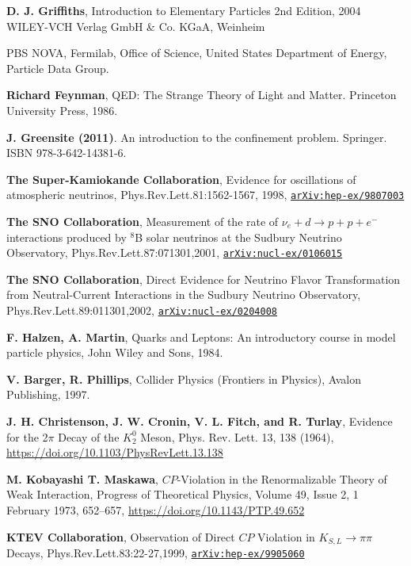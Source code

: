 \documentclass[11pt,a4paper,openright,twoside]{report}
\begin{document}
\begin{thebibliography}{9}
	\textbf{D. J. Griffiths}, Introduction to Elementary Particles 2nd Edition, 2004 WILEY-VCH Verlag GmbH \& Co. KGaA, Weinheim

	PBS NOVA, Fermilab, Office of Science, United States Department of Energy, Particle Data Group.
	
	\textbf{Richard Feynman}, QED: The Strange Theory of Light and Matter. Princeton University Press, 1986.
	
\textbf{J. Greensite (2011)}. An introduction to the confinement problem. Springer. ISBN 978-3-642-14381-6.
	
	\textbf{The Super-Kamiokande Collaboration}, Evidence for oscillations of atmospheric neutrinos, Phys.Rev.Lett.81:1562-1567, 1998, \href{https://arxiv.org/abs/hep-ex/9807003}{\texttt{arXiv:hep-ex/9807003}}
	
	\textbf{The SNO Collaboration}, Measurement of the rate of $\nu_e + d \to p + p + e^-$ interactions produced by ${}^8$B solar neutrinos at the Sudbury Neutrino Observatory, Phys.Rev.Lett.87:071301,2001, \href{https://arxiv.org/abs/nucl-ex/0106015}{\texttt{arXiv:nucl-ex/0106015}}
	
	\textbf{The SNO Collaboration}, Direct Evidence for Neutrino Flavor Transformation from Neutral-Current Interactions in the Sudbury Neutrino Observatory, Phys.Rev.Lett.89:011301,2002, \href{https://arxiv.org/abs/nucl-ex/0204008}{\texttt{arXiv:nucl-ex/0204008}}
	
\textbf{F. Halzen, A. Martin}, Quarks and Leptons: An introductory course in model particle physics, John Wiley and Sons, 1984.

\textbf{V. Barger, R. Phillips}, Collider Physics (Frontiers in Physics), Avalon Publishing, 1997.

\textbf{J. H. Christenson, J. W. Cronin, V. L. Fitch, and R. Turlay}, Evidence for the 2$\pi$ Decay of the $K_2^0$ Meson, Phys. Rev. Lett. 13, 138 (1964), \url{https://doi.org/10.1103/PhysRevLett.13.138}

\textbf{M. Kobayashi T. Maskawa}, $CP$-Violation in the Renormalizable Theory of Weak Interaction, Progress of Theoretical Physics, Volume 49, Issue 2, 1 February 1973, 652–657, \url{https://doi.org/10.1143/PTP.49.652}

\textbf{KTEV Collaboration}, Observation of Direct $CP$ Violation in $K_{S,L}\to \pi\pi$ Decays, Phys.Rev.Lett.83:22-27,1999, \href{https://arxiv.org/abs/hep-ex/9905060}{\texttt{arXiv:hep-ex/9905060}}


\end{thebibliography}
\end{document}
